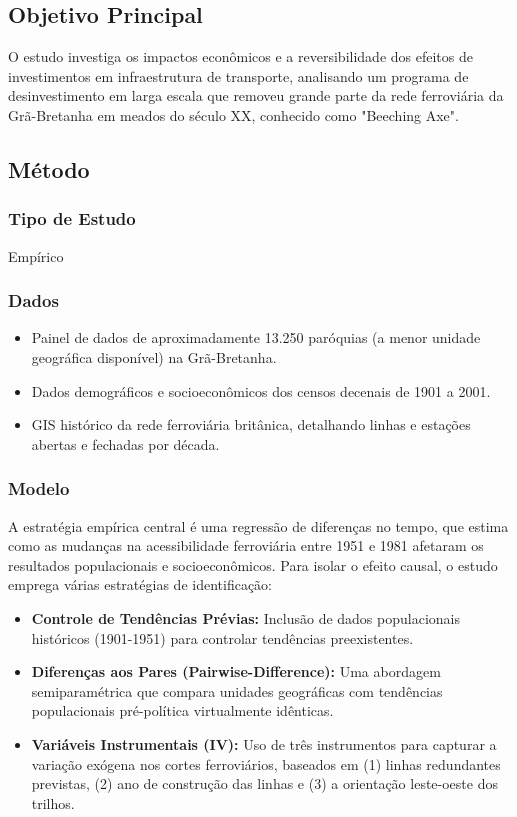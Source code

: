 \documentclass[12pt]{article}
\begin{document}
\subsection*{Objetivo Principal}
O estudo investiga os impactos econômicos e a reversibilidade dos efeitos de investimentos em infraestrutura de transporte, analisando um programa de desinvestimento em larga escala que removeu grande parte da rede ferroviária da Grã-Bretanha em meados do século XX, conhecido como "Beeching Axe".

\subsection*{Método}

\subsubsection*{Tipo de Estudo}
Empírico

\subsubsection*{Dados}
\begin{itemize}
    \item Painel de dados de aproximadamente 13.250 paróquias (a menor unidade geográfica disponível) na Grã-Bretanha.
    \item Dados demográficos e socioeconômicos dos censos decenais de 1901 a 2001.
    \item GIS histórico da rede ferroviária britânica, detalhando linhas e estações abertas e fechadas por década.
\end{itemize}

\subsubsection*{Modelo}
A estratégia empírica central é uma regressão de diferenças no tempo, que estima como as mudanças na acessibilidade ferroviária entre 1951 e 1981 afetaram os resultados populacionais e socioeconômicos. Para isolar o efeito causal, o estudo emprega várias estratégias de identificação:
\begin{itemize}
    \item \textbf{Controle de Tendências Prévias:} Inclusão de dados populacionais históricos (1901-1951) para controlar tendências preexistentes.
    \item \textbf{Diferenças aos Pares (Pairwise-Difference):} Uma abordagem semiparamétrica que compara unidades geográficas com tendências populacionais pré-política virtualmente idênticas.
    \item \textbf{Variáveis Instrumentais (IV):} Uso de três instrumentos para capturar a variação exógena nos cortes ferroviários, baseados em (1) linhas redundantes previstas, (2) ano de construção das linhas e (3) a orientação leste-oeste dos trilhos.
\end{itemize}
\end{document}

